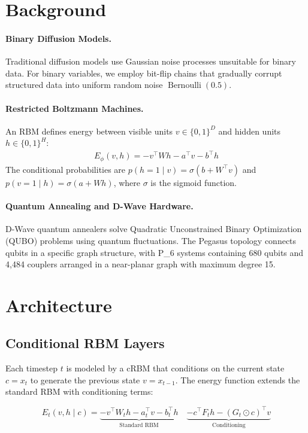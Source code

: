 \documentclass[11pt]{article}
\begin{document}
\section{Background}

\paragraph{Binary Diffusion Models.}
Traditional diffusion models use Gaussian noise processes unsuitable for binary data. For binary variables, we employ bit-flip chains that gradually corrupt structured data into uniform random noise $\operatorname{Bernoulli}(0.5)$.

\paragraph{Restricted Boltzmann Machines.}
An RBM defines energy between visible units $v\in\{0,1\}^{D}$ and hidden units $h\in\{0,1\}^{H}$:
\begin{align}
E_\phi(v,h) = - v^\top W h - a^\top v - b^\top h
\end{align}
The conditional probabilities are $p(h=1\mid v)=\sigma(b+W^\top v)$ and $p(v=1\mid h)=\sigma(a+Wh)$, where $\sigma$ is the sigmoid function.

\paragraph{Quantum Annealing and D-Wave Hardware.}
D-Wave quantum annealers solve Quadratic Unconstrained Binary Optimization (QUBO) problems using quantum fluctuations. The Pegasus topology connects qubits in a specific graph structure, with P_6 systems containing 680 qubits and 4,484 couplers arranged in a near-planar graph with maximum degree 15.

\section{Architecture}

\subsection{Conditional RBM Layers}

Each timestep $t$ is modeled by a cRBM that conditions on the current state $c = x_t$ to generate the previous state $v = x_{t-1}$. The energy function extends the standard RBM with conditioning terms:

$$
E_t(v, h \mid c) = \underbrace{- v^\top W_t h - a_t^\top v - b_t^\top h}_{\text{Standard RBM}} \quad \underbrace{- c^\top F_t h - (G_t \odot c)^\top v}_{\text{Conditioning}}
$$
\end{document}
